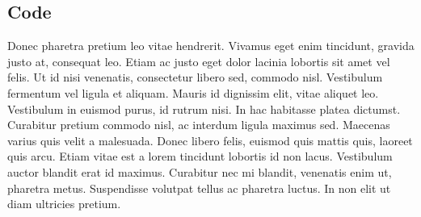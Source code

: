 \documentclass[11pt]{article}
\begin{document}
\begin{doublespace}
  \section{Code}

  Donec pharetra pretium leo vitae hendrerit. Vivamus eget enim
  tincidunt, gravida justo at, consequat leo. Etiam ac justo eget dolor
  lacinia lobortis sit amet vel felis. Ut id nisi venenatis, consectetur
  libero sed, commodo nisl. Vestibulum fermentum vel ligula et
  aliquam. Mauris id dignissim elit, vitae aliquet leo. Vestibulum in
  euismod purus, id rutrum nisi. In hac habitasse platea
  dictumst. Curabitur pretium commodo nisl, ac interdum ligula maximus
  sed. Maecenas varius quis velit a malesuada. Donec libero felis,
  euismod quis mattis quis, laoreet quis arcu. Etiam vitae est a lorem
  tincidunt lobortis id non lacus. Vestibulum auctor blandit erat id
  maximus. Curabitur nec mi blandit, venenatis enim ut, pharetra
  metus. Suspendisse volutpat tellus ac pharetra luctus. In non elit ut
  diam ultricies pretium.

\end{doublespace}
\end{document}
